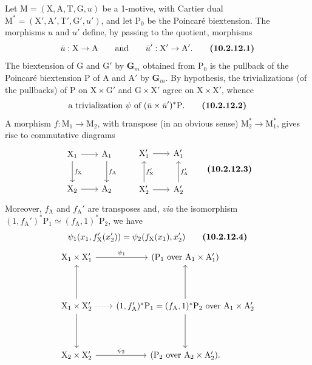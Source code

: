 \documentclass[11pt,leqno]{article}
\begin{document}
Let \(\mathrm{M}=(\mathrm{X},\mathrm{A},\mathrm{T},\mathrm{G},u)\)
be a 1-motive, with Cartier dual
\(\mathrm{M}^{*}=(\mathrm{X}',\mathrm{A}',\mathrm{T}',
\mathrm{G}',u')\), and let \(\mathrm{P}_0\) be the Poincaré
biextension. The morphisms \(u\) and \(u'\) define, by passing
to the quotient, morphisms
\[
\bar{u}:\mathrm{X}\to\mathrm{A}
\qquad\text{and}\qquad
\bar{u}':\mathrm{X}'\to\mathrm{A}'.
\tag*{\textbf{(10.2.12.1)}}
\]
The biextension of \(\mathrm{G}\) and \(\mathrm{G}'\) by
\(\mathbf{G}_m\) obtained from \(\mathrm{P}_0\) is the pullback
of the Poincaré biextension \(\mathrm{P}\) of \(\mathrm{A}\)
and \(\mathrm{A}'\) by \(\mathbf{G}_m\). By hypothesis, the
trivializations (of the pullbacks) of \(\mathrm{P}\) on
\(\mathrm{X}\times\mathrm{G}'\) and
\(\mathrm{G}\times\mathrm{X}'\) agree on
\(\mathrm{X}\times\mathrm{X}'\), whence
\[
\text{a trivialization }\psi\text{ of }
(\bar{u}\times\bar{u}')^{*}\mathrm{P}.
\tag*{\textbf{(10.2.12.2)}}
\]
A morphism \(f:\mathrm{M}_1\to\mathrm{M}_2\), with transpose
(in an obvious sense) \(\mathrm{M}_2^{*}\to\mathrm{M}_1^{*}\),
gives rise to commutative diagrams
\[
\begin{tikzcd}[row sep=2.5em, column sep=2em]
\mathrm{X}_1 \arrow[r] \arrow[d, "f_{\mathrm{X}}"] &
\mathrm{A}_1 \arrow[d, "f_{\mathrm{A}}"]\\
\mathrm{X}_2 \arrow[r] & \mathrm{A}_2
\end{tikzcd}
\qquad
\begin{tikzcd}[row sep=2.5em, column sep=2em]
\mathrm{X}_1' \arrow[r] & \mathrm{A}_1'\\
\mathrm{X}_2' \arrow[r] \arrow[u, "f_{\mathrm{X}}'"'] &
\mathrm{A}_2' \arrow[u, "f_{\mathrm{A}}'"']
\end{tikzcd}
\tag*{\textbf{(10.2.12.3)}}
\]
Moreover, \(f_{\mathrm{A}}\) and \(f_{\mathrm{A}}'\) are transposes
and, \textit{via} the isomorphism
\((1,f_{\mathrm{A}}')^{*}\mathrm{P}_1
\simeq(f_{\mathrm{A}},1)^{*}\mathrm{P}_2\), we have
\[
\psi_1(x_1,f_{\mathrm{X}}'(x_2'))
=\psi_2(f_{\mathrm{X}}(x_1),x_2')
\tag*{\textbf{(10.2.12.4)}}
\]
\[
\begin{tikzcd}[row sep=4em, column sep=2em]
\mathrm{X}_1\times\mathrm{X}_1' \arrow[r, "\psi_1"] &
(\mathrm{P}_1\text{ over }\mathrm{A}_1\times\mathrm{A}_1')
\\
\mathrm{X}_1\times\mathrm{X}_2'
  \arrow[u] \arrow[d] \arrow[r, dotted] &
(1,f_{\mathrm{A}}')^{*}\mathrm{P}_1
=(f_{\mathrm{A}},1)^{*}\mathrm{P}_2
\text{ over }\mathrm{A}_1\times\mathrm{A}_2'
  \arrow[u] \arrow[d]
\\
\mathrm{X}_2\times\mathrm{X}_2' \arrow[r, "\psi_2"] &
(\mathrm{P}_2\text{ over }\mathrm{A}_2\times\mathrm{A}_2').
\end{tikzcd}
\]
\end{document}
